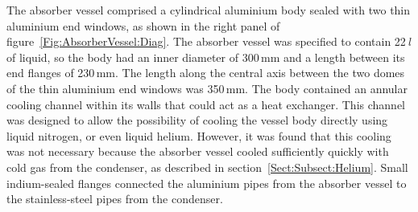 The absorber vessel comprised a cylindrical aluminium body sealed with
two thin aluminium end windows, as shown in the right panel of
figure~\ref{Fig:AbsorberVessel:Diag}.
The absorber vessel was specified to contain 22\,\textit{l} of liquid, so
the body had an inner diameter of 300\,mm and a length between its end
flanges of 230\,mm.  
The length along the central axis between the two domes of the thin aluminium end
windows was 350\,mm.
The body contained an annular cooling channel within its walls
that could act as a heat exchanger. 
This channel was designed to allow the possibility of cooling the
vessel body directly using liquid nitrogen, or even liquid helium. 
However, it was found that this cooling was not necessary because the absorber vessel
cooled sufficiently quickly with cold gas from the condenser,
as described in section~\ref{Sect:Subsect:Helium}. 
Small indium-sealed flanges connected the aluminium pipes from
the absorber vessel to the stainless-steel pipes from the condenser. 

